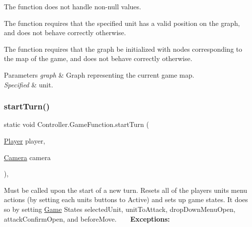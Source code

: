 \begin{DoxyItemize}
\item The function does not handle non-\/null values.
\item The function requires that the specified unit has a valid position on the graph, and does not behave correctly otherwise.
\item The function requires that the graph be initialized with nodes corresponding to the map of the game, and does not behave correctly otherwise. 
\begin{DoxyParams}{Parameters}
{\em graph} & Graph representing the current game map. \\
\hline
{\em Specified} & unit. \\
\hline
\end{DoxyParams}

\end{DoxyItemize}\hypertarget{class_controller_1_1_game_function_acb3bb5d76c1fb5a794e228da98c39009}{}\label{class_controller_1_1_game_function_acb3bb5d76c1fb5a794e228da98c39009} 
\subsubsection{\texorpdfstring{start\+Turn()}{startTurn()}}
{\footnotesize\ttfamily static void Controller.\+Game\+Function.\+start\+Turn (\begin{DoxyParamCaption}\item[{\hyperlink{class_model_1_1_player}{Player}}]{player,  }\item[{\hyperlink{class_view_1_1_camera}{Camera}}]{camera }\end{DoxyParamCaption})\hspace{0.3cm}{\ttfamily [inline]}, {\ttfamily [static]}}

Must be called upon the start of a new turn. Resets all of the player\textquotesingle{}s units\textquotesingle{} menu actions (by setting each unit\textquotesingle{}s buttons to Active) and sets up game states. It does so by setting \hyperlink{class_controller_1_1_game}{Game} State\textquotesingle{}s selected\+Unit, unit\+To\+Attack, drop\+Down\+Menu\+Open, attack\+Confirm\+Open, and before\+Move. ~\newline
~\newline
 {\bfseries Exceptions\+:} ~\newline

